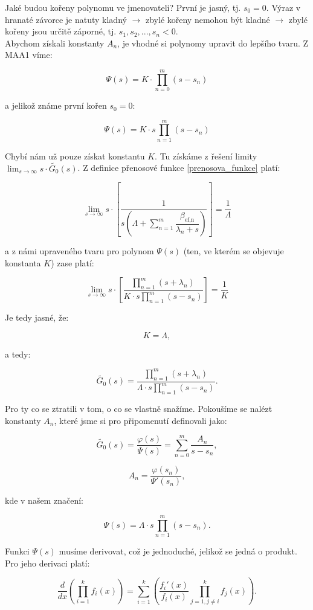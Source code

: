 Jaké budou kořeny polynomu ve jmenovateli? První je jasný, tj. $s_0 = 0$. Výraz v hranaté závorce je natuty kladný $\rightarrow$ zbylé kořeny nemohou být kladné $\rightarrow$ zbylé kořeny jsou určitě záporné, tj. $s_1, s_2, ..., s_n < 0$.\\

Abychom získali konstanty $A_n$, je vhodné si polynomy upravit do lepšího tvaru. Z MAA1 víme:

$$ \Psi(s) = K \cdot \prod_{n=0}^m (s-s_n) $$

a jelikož známe první kořen $s_0 = 0$:

$$ \Psi(s) = K \cdot s \prod_{n=1}^m (s-s_n) $$

Chybí nám už pouze získat konstantu $K$. Tu získáme z řešení limity $\lim_{s \to \infty} s \cdot \tilde{G_0}(s)$. Z definice přenosové funkce \eqref{prenosova_funkce} platí:

$$ \lim_{s \to \infty} s \cdot \left [ \dfrac{1}{s \left ( \Lambda + \sum_{n=1}^m \dfrac{\beta_{\text{ef,n}}}{\lambda_n + s} \right )} \right ] = \dfrac{1}{\Lambda} $$

a z námi upraveného tvaru pro polynom $\Psi(s)$ (ten, ve kterém se objevuje konstanta $K$) zase platí:

$$ \lim_{s \to \infty} s \cdot \left [ \dfrac{\prod_{n=1}^m (s+\lambda_n)}{K \cdot s \prod_{n=1}^m (s-s_n)} \right ] = \dfrac{1}{K} $$

Je tedy jasné, že:

$$ K = \Lambda, $$

a tedy:

$$ \tilde{G_0}(s) = \dfrac{\prod_{n=1}^m (s+\lambda_n)}{\Lambda \cdot s \prod_{n=1}^m (s-s_n)}. $$

Pro ty co se ztratili v tom, o co se vlastně snažíme. Pokoušíme se nalézt konstanty $A_n$, které jsme si pro připomenutí definovali jako:

$$ \tilde{G_0}(s) = \dfrac{\varphi(s)}{\Psi(s)} = \sum_{n=0}^m \dfrac{A_n}{s-s_n}, $$

$$ A_n = \dfrac{\varphi(s_n)}{\Psi'(s_n)}, $$

kde v našem značení:

$$ \Psi(s) = \Lambda \cdot s \prod_{n=1}^m (s-s_n). $$

Funkci $\Psi(s)$ musíme derivovat, což je jednoduché, jelikož se jedná o produkt. Pro jeho derivaci platí:

$$ \dfrac{d}{dx} \left ( \prod_{i=1}^k f_i(x) \right ) = \sum_{i=1}^k \left ( \dfrac{f_i'(x)}{f_i(x)} \prod_{j=1,j \neq i}^k f_j(x) \right ). $$

